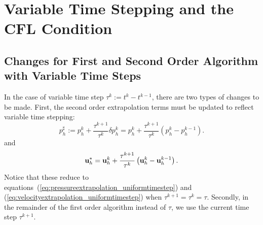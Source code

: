 \documentclass[letterpaper]{erdc}
\begin{document}
%
%
%
\section{Variable Time Stepping and the CFL Condition}

%
%
%
\subsection{Changes for First and Second Order Algorithm with Variable Time Steps}\label{sec:BDF1VariableTimeSteppingAlgorithm}
In the case of variable time step  $\tau^{k} := t^{k}-t^{k-1}$, there are two types of changes to be made.  First, the second order extrapolation terms must be updated to reflect variable time stepping:
\begin{equation}
  p^{\sharp}_h := p_h^{k} + \frac{\tau^{k+1}}{\tau^{k}}\delta p_h^{k} = p_h^{k} + \frac{\tau^{k+1}}{\tau^{k}}\left( p_h^{k} - p_h^{k-1} \right).
\end{equation}
and 
\begin{equation}
  \textbf{u}_h^{*} = \textbf{u}_h^{k} + \frac{\tau^{k+1}}{\tau^k}\left( \textbf{u}_h^{k} - \textbf{u}_h^{k-1}\right).
\end{equation}
Notice that these reduce to equations~(\ref{eq:pressureextrapolation_uniformtimestep}) and (\ref{eq:velocityextrapolation_uniformtimestep}) when $\tau^{k+1} = \tau^{k} = \tau$.  Secondly, in the remainder of the first order algorithm instead of $\tau$, we use the current time step $\tau^{k+1}$.





%
%
\end{document}
